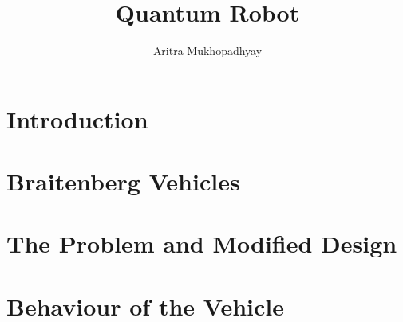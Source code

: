 \documentclass[12pt]{article}
\title{Quantum Robot}
\author{Aritra Mukhopadhyay}
\date{} %
\begin{document}
    

    

    \pagebreak
    \tableofcontents
    
    \pagebreak
    \section{Introduction}
    
    
    \section{Braitenberg Vehicles}
    
    
    \section{The Problem and Modified Design}
    
    
    \section{Behaviour of the Vehicle}
    
    
    
    
    
    
    
    
    
    \pagebreak %
    \listoffigures
    
    
    \nocite{*}
\end{document}
